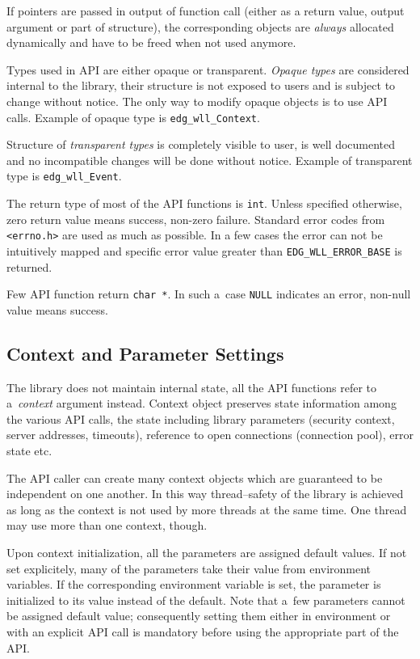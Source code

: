 If pointers are passed in output of function call (either as a return
value, output argument or part of structure), the corresponding
objects are \emph{always} allocated dynamically and have to be freed
when not used anymore. 

Types used in \LB API are either opaque or transparent. \textit{Opaque
types} are considered internal to the library, their structure is not
exposed to users and is subject to change without notice. The only way
to modify opaque objects is to use API calls. Example of opaque type
is \lstinline'edg_wll_Context'.

Structure of \textit{transparent types} is completely visible to
user, is well documented and no incompatible changes will be done
without notice. Example of transparent type is
\lstinline'edg_wll_Event'.

The return type of most of the API functions is \lstinline'int'.
Unless specified otherwise, zero return value means success, non-zero
failure. Standard error codes from \lstinline'<errno.h>' are used as
much as possible. In a few cases the error can not be intuitively
mapped and \LB specific error value greater than
\lstinline'EDG_WLL_ERROR_BASE' is returned.


Few API function return \lstinline'char *'. In such a~case
\lstinline'NULL' indicates an error, non-null value means success.

\subsection{Context and Parameter Settings}
\label{s:context}

The \LB library does not maintain internal state, all the API
functions refer to a~\emph{context} argument instead.
Context object preserves state information among the various API
calls, the state including \LB library parameters (\eg security
context, server addresses, timeouts), reference to open connections
(connection pool), error state etc.

The API caller can create many context objects which are guaranteed
to be independent on one another. In this way thread--safety of the
library is achieved as long as the context is not used by more threads
at the same time. One thread may use more than one context, though.

Upon context initialization, all the parameters are assigned default
values. If not set explicitely, many of the parameters take their
value from environment variables. If the corresponding environment
variable is set, the parameter is initialized to its value instead of
the default. Note that a~few parameters cannot be assigned default
value; consequently setting them either in environment or with an
explicit API call is mandatory before using the appropriate part of
the API.

